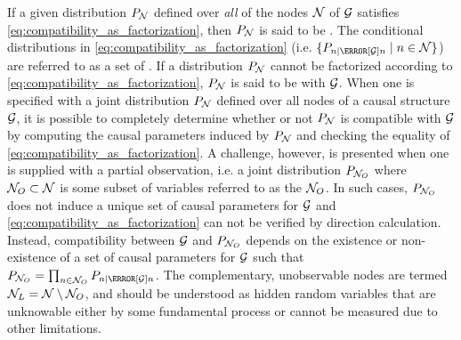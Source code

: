 \documentclass[aps, 10pt, english, twoside, pra, nofootinbib, tightenlines, longbibliography, superscriptaddress]{revtex4-1}
\begin{document}
    If a given distribution $\prob[\nodes]$ defined over \textit{all} of the nodes $\mathcal{N}$ of $\mathcal{G}$ satisfies \cref{eq:compatibility_as_factorization}, then $\prob[\nodes]$ is said to be . The conditional distributions in \cref{eq:compatibility_as_factorization} (i.e. $\{\prob[n \mid \Pa[\graph]{n}] \mid n \in \nodes\}$) are referred to as a set of . If a distribution $\prob[\nodes]$ cannot be factorized according to \cref{eq:compatibility_as_factorization}, $\prob[\nodes]$ is said to be  with $\mathcal{G}$. When one is specified with a joint distribution $\prob[\nodes]$ defined over all nodes of a causal structure $\mathcal{G}$, it is possible to completely determine whether or not $\prob[\nodes]$ is compatible with $\mathcal{G}$ by computing the causal parameters induced by $\prob[\nodes]$ and checking the equality of \cref{eq:compatibility_as_factorization}. A challenge, however, is presented when one is supplied with a partial observation, i.e. a joint distribution $\prob[\nodes_{O}]$ where $\mathcal{N}_{O} \subset \mathcal{N}$ is some subset of variables referred to as the  $\mathcal{N}_O$. In such cases, $\prob[\nodes_{O}]$ does not induce a unique set of causal parameters for $\mathcal{G}$ and \cref{eq:compatibility_as_factorization} can not be verified by direction calculation. Instead, compatibility between $\mathcal{G}$ and $\prob[\nodes_{O}]$ depends on the existence or non-existence of a set of causal parameters for $\mathcal{G}$ such that $\prob[\nodes_{O}] = \prod_{n \in \nodes_{O}} \prob[n \mid \Pa[\graph]{n}]$. The complementary, unobservable nodes are termed  $\mathcal{N}_L = \mathcal{N} \setminus \mathcal{N}_{O}$, and should be understood as hidden random variables that are unknowable either by some fundamental process or cannot be measured due to other limitations.
\end{document}
